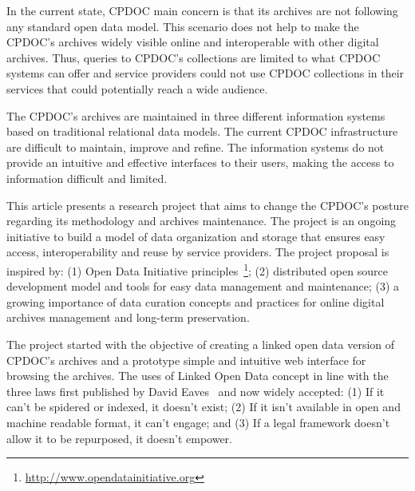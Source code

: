 \documentclass{llncs}
\begin{document}
In the current state, CPDOC main concern is that its archives are not
following any standard open data model. This scenario does not help to
make the CPDOC's archives widely visible online and interoperable with
other digital archives. Thus, queries to CPDOC's collections are
limited to what CPDOC systems can offer and service providers could
not use CPDOC collections in their services that could potentially
reach a wide audience.

The CPDOC's archives are maintained in three different information
systems based on traditional relational data models. The current CPDOC
infrastructure are difficult to maintain, improve and refine. The
information systems do not provide an intuitive and effective
interfaces to their users, making the access to information difficult
and limited.


This article presents a research project that aims to change the
CPDOC's posture regarding its methodology and archives
maintenance. The project is an ongoing initiative to build a model of
data organization and storage that ensures easy access,
interoperability and reuse by service providers. The project proposal
is inspired by: (1) Open Data Initiative
principles~\footnote{\url{http://www.opendatainitiative.org}}; (2)
distributed open source development model and tools for easy data
management and maintenance; (3) a growing importance of data curation
concepts and practices for online digital archives management and
long-term preservation.

The project started with the objective of creating a linked open data
version of CPDOC's archives and a prototype simple and intuitive web
interface for browsing the archives. The uses of Linked Open Data
concept in line with the three laws first published by David
Eaves~\cite{3-law} and now widely accepted: (1) If it can't be
spidered or indexed, it doesn't exist; (2) If it isn't available in
open and machine readable format, it can't engage; and (3) If a legal
framework doesn't allow it to be repurposed, it doesn't empower.
\end{document}
